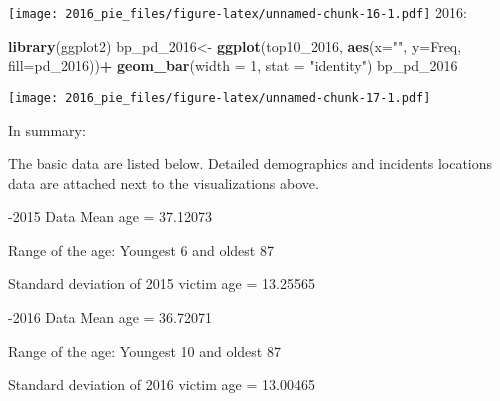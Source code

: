 \documentclass[
]{article}
\newenvironment{Shaded}{\begin{snugshade}}{\end{snugshade}}
\newcommand{\DataTypeTok}[1]{\textcolor[rgb]{0.13,0.29,0.53}{#1}}
\newcommand{\DecValTok}[1]{\textcolor[rgb]{0.00,0.00,0.81}{#1}}
\newcommand{\KeywordTok}[1]{\textcolor[rgb]{0.13,0.29,0.53}{\textbf{#1}}}
\newcommand{\NormalTok}[1]{#1}
\newcommand{\OperatorTok}[1]{\textcolor[rgb]{0.81,0.36,0.00}{\textbf{#1}}}
\newcommand{\StringTok}[1]{\textcolor[rgb]{0.31,0.60,0.02}{#1}}
\begin{document}
\texttt{[image: 2016\_pie\_files/figure-latex/unnamed-chunk-16-1.pdf]}
2016:

\begin{Shaded}
\begin{Highlighting}[]
\KeywordTok{library}\NormalTok{(ggplot2)}
\NormalTok{bp_pd_}\DecValTok{2016}\NormalTok{<-}\StringTok{ }\KeywordTok{ggplot}\NormalTok{(top10_}\DecValTok{2016}\NormalTok{, }\KeywordTok{aes}\NormalTok{(}\DataTypeTok{x=}\StringTok{""}\NormalTok{, }\DataTypeTok{y=}\NormalTok{Freq, }\DataTypeTok{fill=}\NormalTok{pd_}\DecValTok{2016}\NormalTok{))}\OperatorTok{+}
\KeywordTok{geom_bar}\NormalTok{(}\DataTypeTok{width =} \DecValTok{1}\NormalTok{, }\DataTypeTok{stat =} \StringTok{"identity"}\NormalTok{)}
\NormalTok{bp_pd_}\DecValTok{2016}
\end{Highlighting}
\end{Shaded}

\texttt{[image: 2016\_pie\_files/figure-latex/unnamed-chunk-17-1.pdf]}

In summary:

The basic data are listed below. Detailed demographics and incidents
locations data are attached next to the visualizations above.

-2015 Data Mean age = 37.12073

Range of the age: Youngest 6 and oldest 87

Standard deviation of 2015 victim age = 13.25565

-2016 Data Mean age = 36.72071

Range of the age: Youngest 10 and oldest 87

Standard deviation of 2016 victim age = 13.00465
\end{document}
